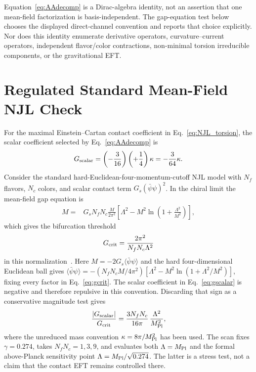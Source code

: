 \documentclass[aps,prd,twocolumn,superscriptaddress,showpacs,preprintnumbers,nofootinbib,longbibliography,floatfix]{revtex4-2}
\begin{document}
Equation~\eqref{eq:AAdecomp} is a Dirac-algebra identity, not an assertion
that one mean-field factorization is basis-independent.  The gap-equation
test below chooses the displayed direct-channel convention and reports that
choice explicitly.  Nor does this identity enumerate derivative operators,
curvature--current operators, independent flavor/color contractions,
non-minimal torsion irreducible components, or the gravitational EFT.

\section{Regulated Standard Mean-Field NJL Check}\label{app:njl_gap}

For the maximal Einstein--Cartan contact coefficient in
Eq.~\eqref{eq:NJL_torsion}, the scalar coefficient selected by
Eq.~\eqref{eq:AAdecomp} is
\begin{equation}\label{eq:gscalar}
G_{\rm scalar}=\left(-\frac{3}{16}\right)\left(+\frac14\right)\kappa
=-\frac{3}{64}\kappa.
\end{equation}
Consider the standard hard-Euclidean-four-momentum-cutoff NJL model with
$N_f$ flavors, $N_c$ colors, and scalar contact term
$G_s(\bar\psi\psi)^2$.  In the chiral limit the mean-field gap equation is
\begin{align}
M={}&G_sN_fN_c\frac{M}{2\pi^2}
\left[\Lambda^2-M^2\ln\!\left(1+\frac{\Lambda^2}{M^2}\right)\right],
\end{align}
which gives the bifurcation threshold
\begin{equation}\label{eq:gcrit}
G_{\rm crit}=\frac{2\pi^2}{N_fN_c\Lambda^2}
\end{equation}
in this normalization~\cite{Klevansky1992,HatsudaKunihiro1994,Buballa2005}.
Here $M=-2G_s\langle\bar\psi\psi\rangle$ and the hard four-dimensional
Euclidean ball gives
$\langle\bar\psi\psi\rangle=-(N_fN_cM/4\pi^2)
[\Lambda^2-M^2\ln(1+\Lambda^2/M^2)]$, fixing every factor in
Eq.~\eqref{eq:gcrit}.
The scalar coefficient in Eq.~\eqref{eq:gscalar} is negative and therefore
repulsive in this convention.  Discarding that sign as a conservative
magnitude test gives
\begin{equation}\label{eq:ratio}
\frac{|G_{\rm scalar}|}{G_{\rm crit}}
=\frac{3N_fN_c}{16\pi}\,\frac{\Lambda^2}{M_{\rm Pl}^2},
\end{equation}
where the unreduced mass convention $\kappa=8\pi/M_{\rm Pl}^2$ has been used.
The scan fixes $\gamma=0.274$, takes $N_fN_c=1,3,9$, and evaluates both
$\Lambda=M_{\rm Pl}$ and the formal above-Planck sensitivity point
$\Lambda=M_{\rm Pl}/\sqrt{0.274}$.  The latter is a stress test, not a claim
that the contact EFT remains controlled there.
\end{document}
